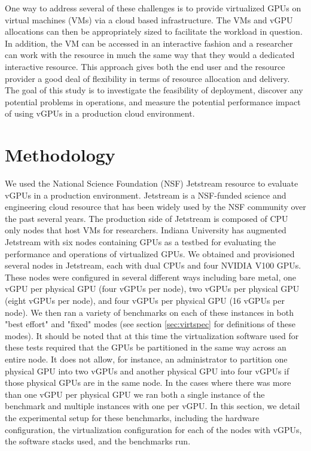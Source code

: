\documentclass[conference]{IEEEtran}
\begin{document}
One way to address several of these challenges is to provide virtualized GPUs on virtual machines (VMs) via a cloud based infrastructure. The VMs and vGPU allocations can then be appropriately sized to facilitate the workload in question. In addition, the VM can be accessed in an interactive fashion and a researcher can work with the resource in much the same way that they would a dedicated interactive resource. This approach gives both the end user and the resource provider a good deal of flexibility in terms of resource allocation and delivery. The goal of this study is to investigate the feasibility of deployment, discover any potential problems in operations, and measure the potential performance impact of using vGPUs in a production cloud environment. 


\section{Methodology} \label{sec:method}
We used the National Science Foundation (NSF) Jetstream resource \cite{jetstream1, jetstream2} to evaluate vGPUs in a production environment. Jetstream is a NSF-funded science and engineering cloud resource that has been widely used by the NSF community over the past several years. The production side of Jetstream is composed of CPU only nodes that host VMs for researchers. Indiana University has augmented Jetstream with six nodes containing GPUs as a testbed for evaluating the performance and operations of virtualized GPUs. We obtained and provisioned several nodes in Jetstream, each with dual CPUs and four NVIDIA V100 GPUs. These nodes were configured in several different ways including bare metal, one vGPU per physical GPU (four vGPUs per node), two vGPUs per physical GPU (eight vGPUs per node), and four vGPUs per physical GPU (16 vGPUs per node). We then ran a variety of benchmarks on each of these instances in both "best effort" and "fixed" modes (see section \ref{sec:virtspec} for definitions of these modes). It should be noted that at this time the virtualization software used for these tests required that the GPUs be partitioned in the same way across an entire node. It does not allow, for instance, an administrator to partition one physical GPU into two vGPUs and another physical GPU into four vGPUs if those physical GPUs are in the same node. In the cases where there was more than one vGPU per physical GPU we ran both a single instance of the benchmark and multiple instances with one per vGPU. In this section, we detail the experimental setup for these benchmarks, including the hardware configuration, the virtualization configuration for each of the nodes with vGPUs, the software stacks used, and the benchmarks run.
\end{document}
